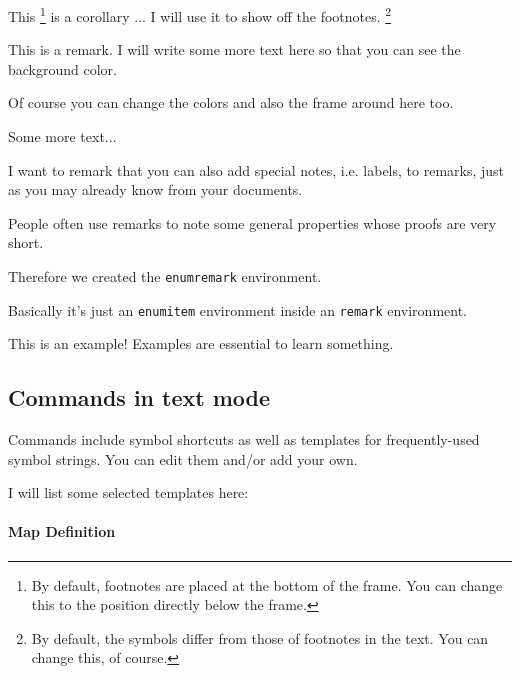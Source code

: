\documentclass[11pt, a4paper]{article}
\begin{document}
\begin{corollary}
  This \footnote{By default, footnotes are placed at the bottom of the frame. You can change this to the position directly below the frame.} is a corollary ...
  I will use it to show off the footnotes. \footnote{By default, the symbols differ from those of footnotes in the text. You can change this, of course.}
\end{corollary}

\begin{remark}
  This is a remark. I will write some more text here so that you can see the background color.

  Of course you can change the colors and also the frame around here too.

  Some more text...
\end{remark}

\begin{remark}[to remarks]
  I want to remark that you can also add special notes, i.e. labels, to remarks, just as you may already know from your documents.
\end{remark}

\begin{enumremark}
  \item People often use remarks to note some general properties whose proofs are very short.
  \item Therefore we created the \verb|enumremark| environment.
  \item Basically it's just an \verb|enumitem| environment inside an \verb|remark| environment.
\end{enumremark}

\begin{example}
  This is an example! Examples are essential to learn something.
\end{example}

\subsection{Commands in text mode}

Commands include symbol shortcuts as well as templates for frequently-used symbol strings. You can edit them and/or add your own.

I will list some selected templates here:

\paragraph{Map Definition}
\end{document}
